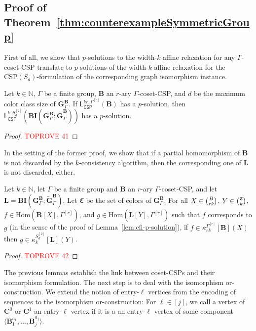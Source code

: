 \documentclass[a4paper,english, thm-restate]{lipics-v2021}
\newcommand{\nat}{\mathbb{N}}
\newcommand{\CFIsym}{\mathbf{G}}
\newcommand{\CFIA}[2]{\CFIsym_{#1}^{#2}}
\newcommand{\CFIB}[2]{\widetilde{\CFIsym}_{#1}^{#2}}
\newcommand{\StructB}{\mathbf{B}}
\newcommand{\StructC}{\mathbf{C}}
\newcommand{\StructL}{\mathbf{L}}
\newcommand{\CSP}[1]{\mathrm{CSP}(#1)}
\newcommand{\kcol}[3]{\kappa_{#1}^{#2}[#3]}
\newcommand{\Hom}[2]{\mathrm{Hom}(#1,#2)}
\newcommand{\leqs}{\mathsf{L}}
\newcommand{\cspiso}[3]{\leqs^{#1,#2}_{\mathsf{CSP}}(#3)}
\newcommand{\bcisosys}[2]{\mathbf{BI}(#1;#2)}
\newcommand{\colors}{\mathfrak{C}}
\newcommand{\CosetGrpTmplt}[2]{#1^{[#2]}}
\newcommand{\Sym}[1]{S_{#1}}
\newcommand{\SymStruct}[2]{\CosetGrpTmplt{\Sym{#1}}{#2}}
\begin{document}
	\subsection{Proof of Theorem~\ref{thm:counterexampleSymmetricGroup}}
	First of all, we show that $p$-solutions to the width-$k$ affine relaxation for any $\Gamma$-coset-CSP translate to $p$-solutions of the width-$k$ affine relaxation for the $\CSP{\Sym{d}}$-formulation of the corresponding graph isomorphism instance.
	
	
	\begin{lemma}
		\label{lem:cfi-p-solution}
		Let $k \in \nat$, $\Gamma$ be a finite group, $\StructB$ an $r$-ary $\Gamma$-coset-CSP,
		and $d$ be the maximum color class size of $\CFIA{\Gamma}{\StructB}$.
		If $\cspiso{kr}{\CosetGrpTmplt{\Gamma}{r}}{\StructB}$ has a $p$-solution,
		then $\cspiso{k}{\SymStruct{d}{2}}{\bcisosys{\CFIA{\Gamma}{\StructB}}{\CFIB{\Gamma}{\StructB}}}$ has a $p$-solution.
	\end{lemma}
	\begin{proof}\textcolor{red}{TOPROVE 41}\end{proof}
	
	\noindent In the setting of the former proof,
	we show that if a partial homomorphism of $\StructB$
	is not discarded by the $k$-consistency algorithm,
	then the corresponding one of $\StructL$ is not discarded, either.
	
	\begin{lemma}
		\label{lem:cfi-k-consistency}
		Let $k \in \nat$, let $\Gamma$ be a finite group and $\StructB$ an $r$-ary $\Gamma$-coset-CSP,
		and let $\StructL = \bcisosys{\CFIA{\Gamma}{\StructB}}{\CFIB{\Gamma}{\StructB}}$.
		Let $\colors$ be the set of colors of $\CFIA{\Gamma}{\StructB}$.
		For all $X \in \tbinom{B}{rk}$, $Y \in \tbinom{\colors}{k}$,
		$f \in \Hom{\StructB[X]}{\CosetGrpTmplt{\Gamma}{r}}$,
		and $g \in \Hom{\StructL[Y]}{\CosetGrpTmplt{\Gamma}{r}}$
		such that $f$ corresponds to $g$
		(in the sense of the proof of Lemma~\ref{lem:cfi-p-solution}),
		if $f \in \kcol{rk}{\CosetGrpTmplt{\Gamma}{r}}{\StructB}(X)$
		then $g \in \kcol{k}{\SymStruct{d}{2}}{\StructL}(Y)$.	
\end{lemma}
	\begin{proof}\textcolor{red}{TOPROVE 42}\end{proof}
	
	The previous lemmas establish the link between coset-CSPs and their isomorphism formulation. The next step is to deal with the isomorphism or-construction.
	We extend the notion of entry-$\ell$ vertices from the encoding of sequences
	to the isomorphism or-construction:
	For $\ell \in [j]$, we call a vertex of $\StructC^0$ or $\StructC^1$
	an entry-$\ell$ vertex
	if it is a an entry-$\ell$ vertex of some component $\langle \StructB_1^{a_1}, \dots, \StructB_j^{a_j} \rangle$.
	
\end{document}
